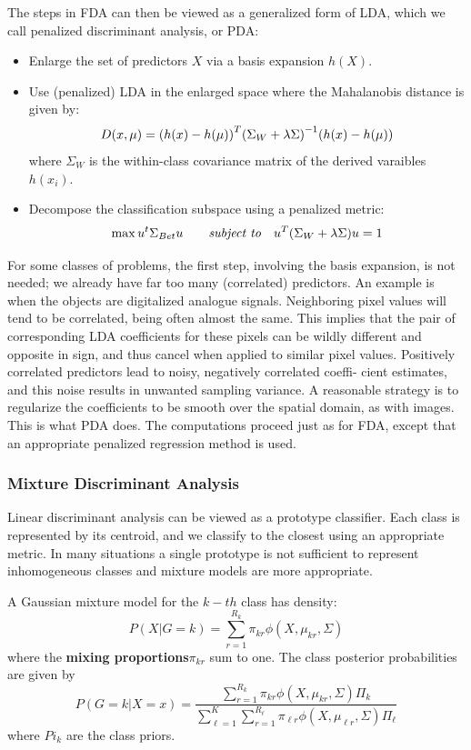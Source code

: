 \documentclass[12pt, letterpaper]{article}
\theoremstyle{definition}
\DeclarePairedDelimiter\autobracket{(}{)}
\newcommand{\br}[1]{\autobracket*{#1}}
\begin{document}
The steps in FDA can then be viewed as a generalized form of LDA, which we call penalized discriminant analysis, or PDA:
\begin{itemize}
\item Enlarge the set of predictors $X$ via a basis expansion $h(X)$.
\item Use (penalized) LDA in the enlarged space where the Mahalanobis distance is given by:
\begin{equation}
D(x, \mu) = \br{h(x) - h(\mu)}^T\br{\Sigma_W+\lambda\Sigma}^{-1} \br{h(x) - h(\mu)}
\end{equation}
where $\Sigma_W$ is the within-class covariance matrix of the derived varaibles $h(x_i)$.
\item Decompose the classification subspace using a penalized metric:
\begin{equation}
\max u^t\Sigma_{Bet}u \quad\quad \textit{subject to} \quad u^T\br{\Sigma_W+\lambda\Sigma}u =1
\end{equation}
\end{itemize}
For some classes of problems, the first step, involving the basis expansion, is not needed; we already have far too many (correlated) predictors. An example is when the objects are digitalized analogue signals. Neighboring pixel values will tend to be correlated, being often almost the same. This implies that the pair of corresponding LDA coefficients for these pixels can be wildly different and opposite in sign, and thus cancel when applied to similar pixel values. Positively correlated predictors lead to noisy, negatively correlated coeffi- cient estimates, and this noise results in unwanted sampling variance. A reasonable strategy is to regularize the coefficients to be smooth over the spatial domain, as with images. This is what PDA does. The computations proceed just as for FDA, except that an appropriate penalized regression method is used.

\subsubsection{Mixture Discriminant Analysis}
Linear discriminant analysis can be viewed as a prototype classifier. Each class is represented by its centroid, and we classify to the closest using an appropriate metric. In many situations a single prototype is not sufficient to represent inhomogeneous classes and mixture models are more appropriate.

A Gaussian mixture model for the $k-th$ class has density:
\begin{equation}
P(X|G=k) = \sum_{r=1}^{R_k} \pi_{kr}\phi(X, \mu_{kr},\Sigma)
\end{equation}
where the \textbf{mixing proportions}$\pi_{kr}$ sum to one. The class posterior probabilities are given by
\begin{equation}
P(G=k|X=x) = \frac{\sum_{r=1}^{R_k} \pi_{kr}\phi(X, \mu_{kr},\Sigma)\Pi_k}{\sum_{\ell=1}^K\sum_{r=1}^{R_\ell} \pi_{\ell r}\phi(X, \mu_{\ell r},\Sigma)\Pi_\ell}
\end{equation}
where $Pi_k$ are the class priors.
\end{document}
